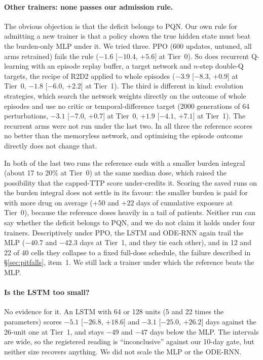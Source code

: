 \documentclass[10pt]{article}
\renewcommand{\cite}{\citep}  %
\begin{document}
\paragraph{Other trainers: none passes our admission rule.} The obvious
objection is that the deficit belongs to PQN. Our own rule for admitting a new
trainer is that a policy shown the true hidden state must beat the burden-only
MLP under it. We tried three. PPO (600 updates, untuned, all arms retrained)
fails the rule ($-1.6$ [$-10.4$, $+5.6$] at Tier~0). So does recurrent
Q-learning with an episode replay buffer, a target network and $n$-step
double-Q targets, the recipe of R2D2 \cite{kapturowski2019} applied to whole
episodes ($-3.9$ [$-8.3$, $+0.9$] at Tier~0, $-1.8$ [$-6.0$, $+2.2$] at
Tier~1). The third is different in kind: evolution strategies, which search
the network weights directly on the outcome of whole episodes and use no critic
or temporal-difference target (2000 generations of 64 perturbations, $-3.1$
[$-7.0$, $+0.7$] at Tier~0, $+1.9$ [$-4.1$, $+7.1$] at Tier~1). The recurrent
arms were not run under the last two. In all three the reference scores no
better than the memoryless network, and optimising the episode outcome
directly does not change that.

In both of the last two runs the reference ends with a smaller burden integral
(about 17 to 20\% at Tier~0) at the same median dose, which raised the
possibility that the capped-TTP score under-credits it. Scoring the saved runs
on the burden integral does not settle in its favour: the smaller burden is
paid for with more drug on average ($+50$ and $+22$ days of cumulative exposure
at Tier~0), because the reference doses heavily in a tail of patients. Neither
run can say whether the deficit belongs to PQN, and we do not claim it holds
under four trainers. Descriptively under PPO, the LSTM and ODE-RNN again trail
the MLP ($-40.7$ and $-42.3$ days at Tier~1, and they tie each other), and in
12 and 22 of 40 cells they collapse to a fixed full-dose schedule, the failure
described in \S\ref{sec:pitfalls}, item~1. We still lack a trainer under which
the reference beats the MLP.

\paragraph{Is the LSTM too small?} No evidence for it. An LSTM with 64 or 128
units (5 and 22 times the parameters) scores $-5.1$ [$-26.8$, $+18.6$] and
$-3.1$ [$-25.0$, $+26.2$] days against the 26-unit one at Tier~1, and stays $-49$
and $-47$ days below the MLP. The intervals are wide, so the registered reading
is ``inconclusive'' against our 10-day gate, but neither size recovers anything.
We did not scale the MLP or the ODE-RNN. %
\end{document}
